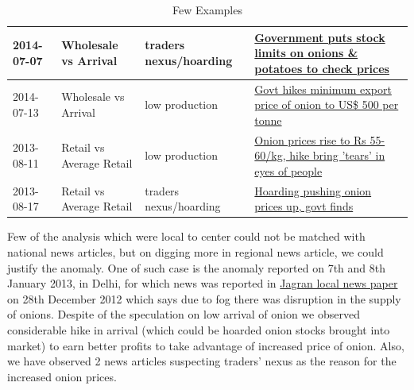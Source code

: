 \documentclass[a4paper,10pt]{article}
\begin{document}
\begin{table}[H]
{\begin{tabular}{|l|l|l|l|}
2014-07-07           & Wholesale vs Arrival     & traders nexus/hoarding        & \href{http://articles.economictimes.indiatimes.com/2014-07-03/news/51057542_1_stock-limits-onions-ravi-shankar-prasad}{Government puts stock limits on onions \& potatoes to check prices}     \\ \hline
2014-07-13           & Wholesale vs Arrival     & low production                & \href{http://timesofindia.indiatimes.com/india/Govt-to-check-onion-prices-with-imports/articleshow/38282324.cms}{Govt hikes minimum export price of onion to US\$ 500 per tonne}         \\ \hline
2013-08-11           & Retail vs Average Retail & low production                & \href{http://www.dnaindia.com/india/report-onion-prices-rise-to-rs-55-60kg-hike-bring-tears-in-eyes-of-people-1873151}{Onion prices rise to Rs 55-60/kg, hike bring 'tears' in eyes of people} \\ \hline
2013-08-17           & Retail vs Average Retail & traders nexus/hoarding        & \href{http://timesofindia.indiatimes.com/india/Hoarding-pushing-onion-prices-up-govt-finds/articleshow/21872501.cms}{Hoarding pushing onion prices up, govt finds}                           \\ \hline
\end{tabular}}

\caption{Few Examples}
\label{examples}

\end{table}

Few of the analysis which were local to center could not be matched with national news articles, but on digging more in regional news article, we could justify the anomaly. One of such case is the anomaly reported on 7th and 8th January 2013, in Delhi, for which news was reported in \href{http://www.jagran.com/news/business-onion-price-affected-from-fog-9987751.html}{Jagran local news paper} on 28th December 2012 which says due to fog there was disruption in the supply of onions. Despite of the speculation on low arrival of onion we observed considerable hike in arrival (which could be hoarded onion stocks brought into market) to earn better profits to take advantage of increased price of onion. Also, we have observed 2 news articles suspecting traders' nexus as the reason for the increased onion prices.
\end{document}
